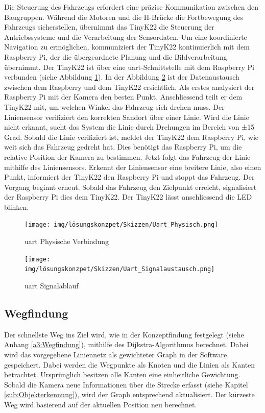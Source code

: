 \documentclass[../main.tex]{subfiles}
\begin{document}
Die Steuerung des Fahrzeugs erfordert eine präzise Kommunikation zwischen den Baugruppen. Während die Motoren und die H-Brücke die Fortbewegung des Fahrzeugs sicherstellen, übernimmt das TinyK22 die Steuerung der Antriebssysteme und die Verarbeitung der Sensordaten. Um eine koordinierte Navigation zu ermöglichen, kommuniziert der TinyK22 kontinuierlich mit dem Raspberry Pi, der die übergeordnete Planung und die Bildverarbeitung übernimmt.
\newpage
Der TinyK22 ist über eine \Gls{uart}-Schnittstelle mit dem Raspberry Pi verbunden (siehe Abbildung \ref{img:UART_Physisch}). In der Abbildung \ref{img:UART_Signalablauf} ist der Datenaustausch zwischen dem Raspberry und dem TinyK22 ersichtlich. Als erstes  analysiert der Raspberry Pi mit der Kamera den besten Punkt. Anschliessend teilt er dem TinyK22 mit, um welchen Winkel das Fahrzeug sich drehen muss. Der Liniensensor verifiziert den korrekten Sandort über einer Linie. Wird die Linie nicht erkannt, sucht das System die Linie durch Drehungen im Bereich von ±15 Grad. Sobald die Linie verifiziert ist, meldet der TinyK22 dem Raspberry Pi, wie weit sich das Fahrzeug gedreht hat. Dies benötigt das Raspberry Pi, um die relative Position der Kamera zu bestimmen. Jetzt folgt das Fahrzeug der Linie mithilfe des Liniensensors. Erkennt der Liniensensor eine breitere Linie, also einen Punkt, informiert der TinyK22 den Raspberry Pi und stoppt das Fahrzeug. Der Vorgang beginnt erneut. Sobald das Fahrzeug den Zielpunkt erreicht, signalisiert der Raspberry Pi dies dem TinyK22. Der TinyK22 lässt anschliessend die LED blinken.

\begin{figure}[H]
\centering
\texttt{[image: img/lösungskonzpet/Skizzen/Uart\_Physisch.png]}
\caption{\Gls{uart} Physische Verbindung}
\label{img:UART_Physisch}
\end{figure}

\begin{figure}[H]
\centering
\texttt{[image: img/lösungskonzpet/Skizzen/Uart\_Signalaustausch.png]}
\caption{\Gls{uart} Signalablauf}
\label{img:UART_Signalablauf}
\end{figure}




\newpage

\subsection{Wegfindung}

Der schnellste Weg ins Ziel wird, wie in der Konzeptfindung festgelegt (siehe Anhang \ref{a3:Wegfindung}), mithilfe des Dijkstra-Algorithmus berechnet. Dabei wird das vorgegebene Liniennetz als gewichteter Graph in der Software gespeichert. Dabei werden die Wegpunkte als Knoten und die Linien als Kanten betrachtet. Ursprünglich besitzen alle Kanten eine einheitliche Gewichtung. Sobald die Kamera neue Informationen über die Strecke erfasst (siehe Kapitel \ref{sub:Objekterkennung}), wird der Graph entsprechend aktualisiert. Der kürzeste Weg wird basierend auf der aktuellen Position neu berechnet.
\end{document}
